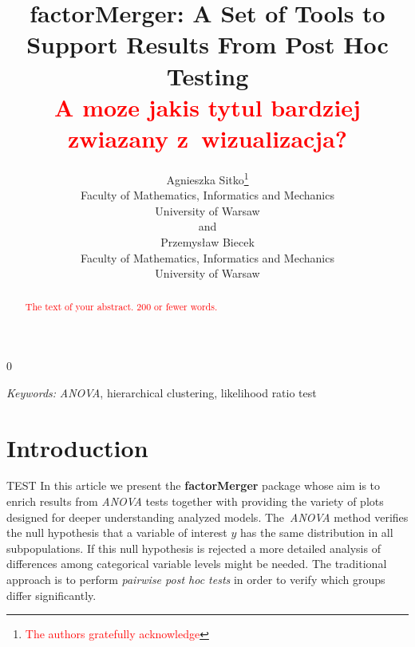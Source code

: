 \documentclass[12pt]{article}
\newcommand{\blind}{0}
\newcommand{\factorMerger}{\textbf{factorMerger }}
\newcommand{\todo}{\textcolor{red}}
\begin{document}
%

\def\spacingset#1{\renewcommand{\baselinestretch}%
{#1}\small\normalsize} \spacingset{1}



\blind
{
  \title{\bf factorMerger: A Set of Tools to Support
  	Results From Post Hoc Testing \\
  	\todo{A moze jakis tytul bardziej 
  	zwiazany z~wizualizacja?}}
  \author{Agnieszka Sitko\thanks{
    \todo{The authors gratefully acknowledge}}\hspace{.2cm}\\
    Faculty of Mathematics,  
    Informatics and Mechanics \\
    University of Warsaw\\
    and \\
    Przemys\l{}aw Biecek \\
    Faculty of Mathematics,  
    Informatics and Mechanics \\
    University of Warsaw}
  \maketitle
} \fi

\bigskip
\begin{abstract}
\todo{The text of your abstract.  200 or fewer words.}
\end{abstract}

\noindent%
{\it Keywords:}  \textit{ANOVA}, hierarchical clustering, likelihood ratio test 
\vfill

\newpage
\spacingset{1.45} %
\section{Introduction}
\label{sec:intro}
TEST
In this article we present the \factorMerger package whose aim is to enrich results from \emph{ANOVA} tests together with providing the variety of plots designed for deeper understanding analyzed models. The~\emph{ANOVA} method verifies the null hypothesis that a variable of interest $y$ has the same distribution in all subpopulations.
If this null hypothesis is rejected a more detailed analysis of differences among categorical variable levels might be needed. The traditional approach is to perform \emph{pairwise post hoc tests} in order to verify which groups differ significantly. 
\end{document}

